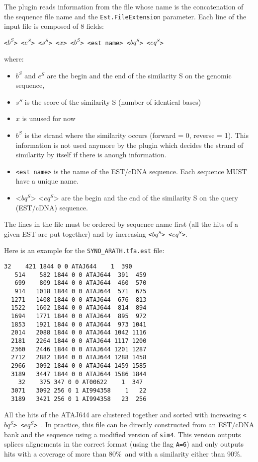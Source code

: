The plugin reads information from the file whose name is the concatenation 
of the sequence file name and the \texttt{Est.FileExtension} parameter. 
Each line of the input file is composed of 8 fields:


\texttt{<$b^S$> <$e^S$> <$s^S$> <$x$> <$b^S$> <est name> <$bq^S$> <$eq^S$>}

where:
\begin{itemize}
\item $b^S$ and $e^S$ are the begin and the end of the similarity S on the genomic sequence,

\item $s^S$ is the score of the similarity S (number of identical bases)
\item $x$ is unused for now
\item $b^S$ is the strand where the similarity occurs (forward = 0,
  reverse = 1). This information is not used anymore by the plugin
  which decides the strand of similarity by itself if there is anough
  information.
\item \texttt{<est name>} is the name of the EST/cDNA sequence. Each
  sequence MUST have a unique name.
\item <$bq^S$> <$eq^S$> are the begin and the end of the similarity S
  on the query (EST/cDNA) sequence.
\end{itemize}
The lines in the file must be ordered by sequence name first (all the
hits of a given EST are put together) and by increasing
\texttt{<$bq^S$> <$eq^S$>}. 

Here is an example for the \texttt{SYNO\_ARATH.tfa.est} file:
\begin{Verbatim}[fontsize=\small]
    32    421 1844 0 0 ATAJ644    1  390
   514    582 1844 0 0 ATAJ644  391  459
   699    809 1844 0 0 ATAJ644  460  570
   914   1018 1844 0 0 ATAJ644  571  675
  1271   1408 1844 0 0 ATAJ644  676  813
  1522   1602 1844 0 0 ATAJ644  814  894
  1694   1771 1844 0 0 ATAJ644  895  972
  1853   1921 1844 0 0 ATAJ644  973 1041
  2014   2088 1844 0 0 ATAJ644 1042 1116
  2181   2264 1844 0 0 ATAJ644 1117 1200
  2360   2446 1844 0 0 ATAJ644 1201 1287
  2712   2882 1844 0 0 ATAJ644 1288 1458
  2966   3092 1844 0 0 ATAJ644 1459 1585
  3189   3447 1844 0 0 ATAJ644 1586 1844
    32    375 347 0 0 AT00622    1  347
  3071   3092 256 0 1 AI994358    1   22
  3189   3421 256 0 1 AI994358   23  256
\end{Verbatim}

All the hits of the ATAJ644 are clustered together and sorted with
increasing \texttt{<$bq^S$> <$eq^S$> }. In practice, this file can be
directly constructed from an EST/cDNA bank and the sequence using a
modified version of \texttt{sim4}. This version outputs splices
alignements in the correct format (using the flag \texttt{A=6}) and
only outputs hits with a coverage of more than 80\%\ and with a
similarity either than 90\%.

